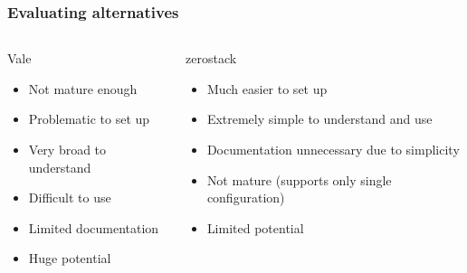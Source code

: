 \documentclass{beamer}
\begin{document}
\addtocounter{page}{1}
\begin{frame}
\addtocounter{page}{-1}
\frametitle{Evaluating alternatives}

\begin{columns}

\begin{column}{0.5\textwidth}
\begin{block}{Vale}
\begin{itemize}
\item Not mature enough
\item Problematic to set up
\item Very broad to understand
\item Difficult to use
\item Limited documentation
\item Huge potential
\end{itemize}
\end{block}
\end{column}

\begin{column}{0.5\textwidth}
\begin{block}{zerostack}
\begin{itemize}
\item Much easier to set up
\item Extremely simple to understand and use
\item Documentation unnecessary due to simplicity
\item Not mature (supports only single configuration)
\item Limited potential
\end{itemize}
\end{block}
\end{column}

\end{columns}

\end{frame}








\end{document}
